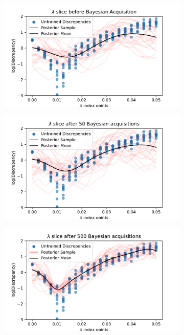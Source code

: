 \begin{figure}[htbp]
\begin{subfigure}[b]{0.33\textwidth}
    \end{subfigure}
    \hfill%
    \begin{subfigure}[b]{0.33\textwidth}
        \centering
        \includegraphics[width=\textwidth]{../champagne_GP_images/initial_lambda_slice_log_discrep.pdf}
    \end{subfigure}%
    \hfill%
    \begin{subfigure}[b]{0.33\textwidth}
        \centering
        \includegraphics[width=\textwidth]{../champagne_GP_images/lambda_slice_50_bolfi_updates_log_discrep.pdf}
    \end{subfigure}%
    \hfill%
    \begin{subfigure}[b]{0.33\textwidth}
        \centering
        \includegraphics[width=\textwidth]{../champagne_GP_images/lambda_slice_500_bolfi_updates_log_discrep.pdf}

\end{subfigure}
\end{figure}
